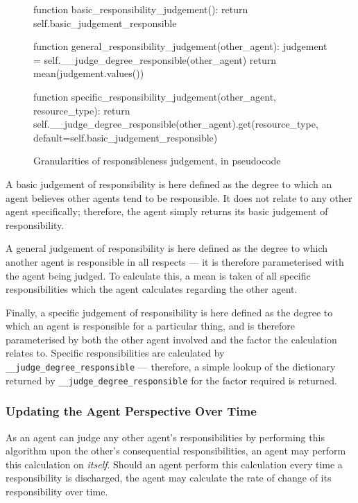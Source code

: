 \begin{figure}[h]
    \centering
    \begin{pseudocodelisting}
    function basic_responsibility_judgement():
        return self.basic_judgement_responsible

    function general_responsibility_judgement(other_agent):
        judgement = self.__judge_degree_responsible(other_agent)
        return mean(judgement.values())

    function specific_responsibility_judgement(other_agent, resource_type):
        return self.__judge_degree_responsible(other_agent).get(resource_type, default=self.basic_judgement_responsible)
    \end{pseudocodelisting}
    \caption{Granularities of responsibleness judgement, in pseudocode}
    \label{code:judgement_granularities}
\end{figure}

A basic judgement of responsibility is here defined as the degree to which an agent believes other agents tend to be responsible. It does not relate to any other agent specifically; therefore, the agent simply returns its basic judgement of responsibility.\par

A general judgement of responsibility is here defined as the degree to which another agent is responsible in all respects --- it is therefore parameterised with the agent being judged. To calculate this, a mean is taken of all specific responsibilities which the agent calculates regarding the other agent.\par

Finally, a specific judgement of responsibility is here defined as the degree to which an agent is responsible for a particular thing, and is therefore parameterised by both the other agent involved and the factor the calculation relates to. Specific responsibilities are calculated by \\\texttt{\_\_judge\_degree\_responsible} --- therefore, a simple lookup of the dictionary returned by \texttt{\_\_judge\_degree\_responsible} for the factor required is returned.

\subsubsection{Updating the Agent Perspective Over Time}
As an agent can judge any other agent's responsibilities by performing this algorithm upon the other's consequential responsibilities, an agent may perform this calculation on \emph{itself}. Should an agent perform this calculation every time a responsibility is discharged, the agent may calculate the rate of change of its responsibility over time.\par


